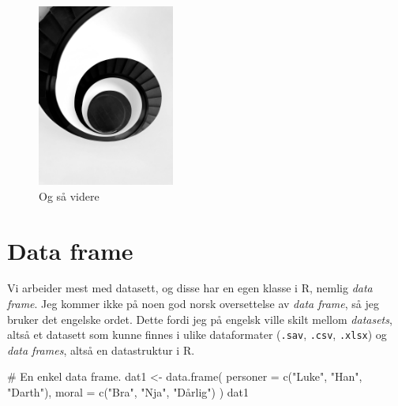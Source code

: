 \documentclass[
  letterpaper,
  DIV=11,
  numbers=noendperiod]{scrreprt}
\newenvironment{Shaded}{\begin{snugshade}}{\end{snugshade}}
\newcommand{\AttributeTok}[1]{\textcolor[rgb]{0.40,0.45,0.13}{#1}}
\newcommand{\CommentTok}[1]{\textcolor[rgb]{0.37,0.37,0.37}{#1}}
\newcommand{\FunctionTok}[1]{\textcolor[rgb]{0.28,0.35,0.67}{#1}}
\newcommand{\NormalTok}[1]{\textcolor[rgb]{0.00,0.23,0.31}{#1}}
\newcommand{\OtherTok}[1]{\textcolor[rgb]{0.00,0.23,0.31}{#1}}
\newcommand{\StringTok}[1]{\textcolor[rgb]{0.13,0.47,0.30}{#1}}
\begin{document}
\begin{figure}

{\centering \includegraphics[width=0.4\textwidth,height=\textheight]{./img/spiral-robin-schreiner-d8OiIdAdKNA-unsplash.jpg}

}

\caption{Og så videre}

\end{figure}


\hypertarget{data-frame}{%
\chapter{Data frame}\label{data-frame}}

Vi arbeider mest med datasett, og disse har en egen klasse i R, nemlig
\emph{data frame}. Jeg kommer ikke på noen god norsk oversettelse av
\emph{data frame}, så jeg bruker det engelske ordet. Dette fordi jeg på
engelsk ville skilt mellom \emph{datasets}, altså et datasett som kunne
finnes i ulike dataformater (\texttt{.sav}, \texttt{.csv},
\texttt{.xlsx}) og \emph{data frames}, altså en datastruktur i R.

\begin{Shaded}
\begin{Highlighting}[]
\CommentTok{\# En enkel data frame.}
\NormalTok{dat1 }\OtherTok{\textless{}{-}} \FunctionTok{data.frame}\NormalTok{(}
  \AttributeTok{personer =} \FunctionTok{c}\NormalTok{(}\StringTok{"Luke"}\NormalTok{, }\StringTok{"Han"}\NormalTok{, }\StringTok{"Darth"}\NormalTok{),}
  \AttributeTok{moral =} \FunctionTok{c}\NormalTok{(}\StringTok{"Bra"}\NormalTok{, }\StringTok{"Nja"}\NormalTok{, }\StringTok{"Dårlig"}\NormalTok{)}
\NormalTok{)}
\NormalTok{dat1}
\end{Highlighting}
\end{Shaded}
\end{document}
